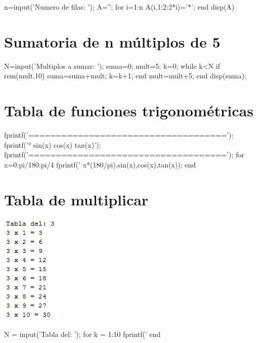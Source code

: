 \sol

\begin{matlab}
n=input('Numero de filas: ');
A='';
for i=1:n
    A(i,1:2:2*i)='*';
end
disp(A)
\end{matlab}


\section{Sumatoria de n múltiplos de 5}


\begin{matlab}
N=input('Multiplos a sumar: ');
suma=0;
mult=5;
k=0;
while k<N
    if rem(mult,10)
        suma=suma+mult;
        k=k+1;
    end
    mult=mult+5;
end
disp(suma);
\end{matlab}

\section{Tabla de funciones trigonométricas}


\begin{matlab}
fprintf('====================================\n');
fprintf('°    sin(x)      cos(x)      tan(x)\n');
fprintf('====================================\n');
for x=0:pi/180:pi/4
    fprintf('%
        x*(180/pi),sin(x),cos(x),tan(x));
end
\end{matlab}

\section{Tabla de multiplicar} 


\begin{center}
\includegraphics[scale=0.8]{src/tablamult.png}
\end{center}

\sol

\begin{matlab}
N = input('Tabla del: ');
for k = 1:10
    fprintf('%
end
\end{matlab}